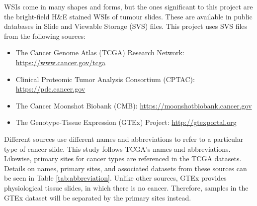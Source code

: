 \documentclass{l4proj}
\begin{document}
WSIs come in many shapes and forms, but the ones significant to this project are the bright-field H\&E stained WSIs of tumour slides. These are available in public databases in Slide and Viewable Storage (SVS) files. This project uses SVS files from the following sources:
\begin{itemize}
    \item The Cancer Genome Atlas (TCGA) Research Network: \url{https://www.cancer.gov/tcga}
    \item Clinical Proteomic Tumor Analysis Consortium (CPTAC): \url{https://pdc.cancer.gov}
    \item The Cancer Moonshot Biobank (CMB): \url{https://moonshotbiobank.cancer.gov}
    \item The Genotype-Tissue Expression (GTEx) Project: \url{http://gtexportal.org}
\end{itemize}

Different sources use different names and abbreviations to refer to a particular type of cancer slide. This study follows TCGA's names and abbreviations. Likewise, primary sites for cancer types are referenced in the TCGA datasets. Details on names, primary sites, and associated datasets from these sources can be seen in Table \ref{tab:abbreviation}. Unlike other sources, GTEx provides physiological tissue slides, in which there is no cancer. Therefore, samples in the GTEx dataset will be separated by the primary sites instead. 
\end{document}
